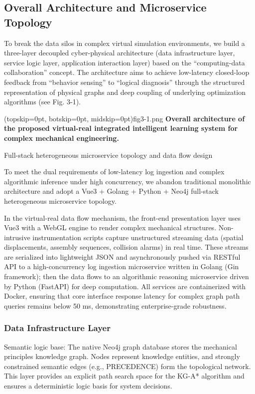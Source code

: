 \documentclass{ieeeaccess}
\begin{document}
\subsection{Overall Architecture and Microservice Topology}
To break the data silos in complex virtual simulation environments, we build a three-layer decoupled cyber-physical architecture (data infrastructure layer, service logic layer, application interaction layer) based on the ``computing-data collaboration'' concept. The architecture aims to achieve low-latency closed-loop feedback from ``behavior sensing'' to ``logical diagnosis'' through the structured representation of physical graphs and deep coupling of underlying optimization algorithms (see Fig. 3-1).

\Figure[t!](topskip=0pt, botskip=0pt, midskip=0pt){fig3-1.png}
{ \textbf{Overall architecture of the proposed virtual-real integrated intelligent learning system for complex mechanical engineering.}\label{fig3-1}}

Full-stack heterogeneous microservice topology and data flow design

To meet the dual requirements of low-latency log ingestion and complex algorithmic inference under high concurrency, we abandon traditional monolithic architecture and adopt a Vue3 + Golang + Python + Neo4j full-stack heterogeneous microservice topology.

In the virtual-real data flow mechanism, the front-end presentation layer uses Vue3 with a WebGL engine to render complex mechanical structures. Non-intrusive instrumentation scripts capture unstructured streaming data (spatial displacements, assembly sequences, collision alarms) in real time. These streams are serialized into lightweight JSON and asynchronously pushed via RESTful API to a high-concurrency log ingestion microservice written in Golang (Gin framework); then the data flows to an algorithmic reasoning microservice driven by Python (FastAPI) for deep computation. All services are containerized with Docker, ensuring that core interface response latency for complex graph path queries remains below 50 ms, demonstrating enterprise-grade robustness.

\subsubsection{Data Infrastructure Layer}
Semantic logic base: The native Neo4j graph database stores the mechanical principles knowledge graph. Nodes represent knowledge entities, and strongly constrained semantic edges (e.g., PRECEDENCE) form the topological network. This layer provides an explicit path search space for the KG-A* algorithm and ensures a deterministic logic basis for system decisions.
\end{document}
